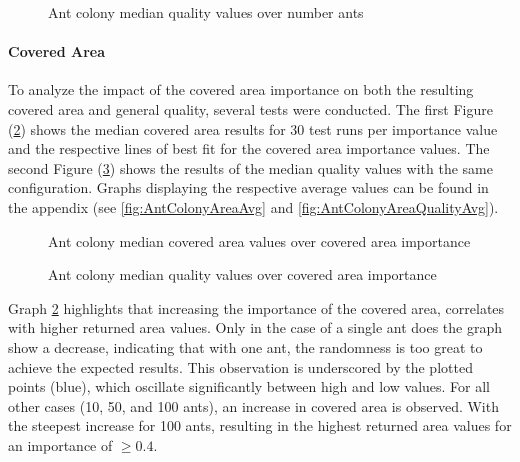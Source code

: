 

\begin{figure}
	\centering
	
	\caption{Ant colony median quality values over number ants}
	\label{fig:AntColonyQualityAnts}
\end{figure}




\paragraph{Covered Area}

To analyze the impact of the covered area importance on both the resulting covered area and general quality, several tests were conducted.
The first Figure (\ref{fig:AntColonyAreaMed}) shows the median covered area results for 30 test runs per importance value and the respective lines of best fit for the covered area importance values.
The second Figure (\ref{fig:AntColonyAreaQualityMed}) shows the results of the median quality values with the same configuration.
Graphs displaying the respective average values can be found in the appendix (see \ref{fig:AntColonyAreaAvg} and \ref{fig:AntColonyAreaQualityAvg}).

\begin{figure}
	\centering
	
	\caption{Ant colony median covered area values over covered area importance}
	\label{fig:AntColonyAreaMed}
\end{figure}

\begin{figure}
	\centering
	
	\caption{Ant colony median quality values over covered area importance}
	\label{fig:AntColonyAreaQualityMed}
\end{figure}

Graph \ref{fig:AntColonyAreaMed} highlights that increasing the importance of the covered area, correlates with higher returned area values.
Only in the case of a single ant does the graph show a decrease, indicating that with one ant, the randomness is too great to achieve the expected results.
This observation is underscored by the plotted points (blue), which oscillate significantly between high and low values.
For all other cases (10, 50, and 100 ants), an increase in covered area is observed.
With the steepest increase for 100 ants, resulting in the highest returned area values for an importance of $\geq 0.4$.


